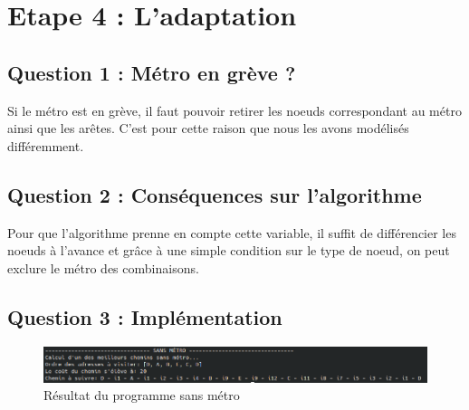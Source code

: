     \newpage



\section{Etape 4 : L'adaptation}

  \subsection{Question 1 : Métro en grève ?}
    Si le métro est en grève, il faut pouvoir retirer les noeuds correspondant au métro ainsi que les arêtes. C'est pour cette raison que nous les avons modélisés différemment.
  \subsection{Question 2 : Conséquences sur l'algorithme}
    Pour que l'algorithme prenne en compte cette variable, il suffit de différencier les noeuds à l'avance et grâce à une simple condition sur le type de noeud, on peut exclure le métro des combinaisons.
  \subsection{Question 3 : Implémentation}

    \begin{figure}[h!]
            \centering
                \includegraphics[width=1\textwidth]{images/resultatSansMetro.png}
            \caption{Résultat du programme sans métro}
            \label{fig:graphe} %
    \end{figure}

    \newpage

